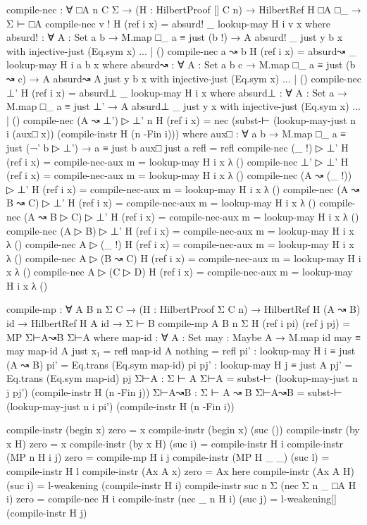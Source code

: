 \begin{spverbatim}
compile-nec : ∀ {□A n C Σ}
  → (H : HilbertProof [] C n) → HilbertRef H □A □_ → Σ ⊢ □A
compile-nec {v !} H (ref i x) = absurd! {_} {lookup-may H i} {v} x
  where
  absurd! : ∀ {A : Set} {a b} → M.map □_ a ≡ just (b !) → A
  absurd! {_} {just y} {b} x with injective-just (Eq.sym x)
  ... | ()
compile-nec {a ↝ b} H (ref i x) = absurd↝ {_} {lookup-may H i} {a} {b} x
  where
  absurd↝ : ∀ {A : Set} {a b c} → M.map □_ a ≡ just (b ↝ c) → A
  absurd↝ {A} {just y} {b} x with injective-just (Eq.sym x)
  ... | ()
compile-nec {⊥'} H (ref i x) = absurd⊥ {_} {lookup-may H i} x
  where
  absurd⊥ : ∀ {A : Set} {a} → M.map □_ a ≡ just ⊥' → A
  absurd⊥ {_} {just y} x with injective-just (Eq.sym x)
  ... | ()
compile-nec {(A ↝ ⊥') ▷ ⊥'} {n} H (ref i x) =
   nec (subst-⊢ (lookup-may-just {n} {i} (aux□ x)) (compile-instr H (n -Fin i)))
  where
  aux□ : ∀ {a b} → M.map □_ a ≡ just (¬' b ▷ ⊥') → a ≡ just b
  aux□ {just a} refl = refl
compile-nec {(_ !) ▷ ⊥'} H (ref i x) = compile-nec-aux {m = lookup-may H i} x λ ()
compile-nec {⊥' ▷ ⊥'} H (ref i x) = compile-nec-aux {m = lookup-may H i} x λ ()
compile-nec {(A ↝ (_ !)) ▷ ⊥'} H (ref i x) = compile-nec-aux {m = lookup-may H i} x λ ()
compile-nec {(A ↝ B ↝ C) ▷ ⊥'} H (ref i x) = compile-nec-aux {m = lookup-may H i} x λ ()
compile-nec {(A ↝ B ▷ C) ▷ ⊥'} H (ref i x) = compile-nec-aux {m = lookup-may H i} x λ ()
compile-nec {(A ▷ B) ▷ ⊥'} H (ref i x) = compile-nec-aux {m = lookup-may H i} x λ ()
compile-nec {A ▷ (_ !)} H (ref i x) = compile-nec-aux {m = lookup-may H i} x λ ()
compile-nec {A ▷ (B ↝ C)} H (ref i x) = compile-nec-aux {m = lookup-may H i} x λ ()
compile-nec {A ▷ (C ▷ D)} H (ref i x) = compile-nec-aux {m = lookup-may H i} x λ ()

compile-mp : ∀ {A B n Σ C}
  → (H : HilbertProof Σ C n) → HilbertRef H (A ↝ B) id → HilbertRef H A id
  → Σ ⊢ B
compile-mp {A} {B} {n} {Σ} H (ref i pi) (ref j pj) = MP Σ⊢A↝B Σ⊢A
  where
  map-id : ∀ {A : Set} {may : Maybe A} → M.map id may ≡ may
  map-id {A} {just x₁} = refl
  map-id {A} {nothing} = refl
  pi' : lookup-may H i ≡ just (A ↝ B)
  pi' = Eq.trans (Eq.sym map-id) pi
  pj' : lookup-may H j ≡ just A
  pj' = Eq.trans (Eq.sym map-id) pj
  Σ⊢A : Σ ⊢ A
  Σ⊢A = subst-⊢ (lookup-may-just {n} {j} pj') (compile-instr H (n -Fin j))
  Σ⊢A↝B : Σ ⊢ A ↝ B
  Σ⊢A↝B = subst-⊢ (lookup-may-just {n} {i} pi') (compile-instr H (n -Fin i))

compile-instr (begin x) zero = x
compile-instr (begin x) (suc ())
compile-instr (by x H) zero = x
compile-instr (by x H) (suc i) = compile-instr H i
compile-instr (MP {n} H i j) zero = compile-mp H i j
compile-instr (MP H _ _) (suc l) = compile-instr H l
compile-instr (Ax A x) zero = Ax here
compile-instr (Ax A H) (suc i) = l-weakening (compile-instr H i)
compile-instr {suc n} {Σ} (nec {Σ} {n} {_} {□A} H i) zero = compile-nec H i
compile-instr (nec {_} {n} H i) (suc j) = l-weakening[] (compile-instr H j)


\end{spverbatim}
